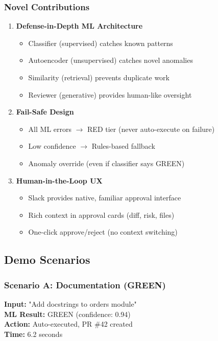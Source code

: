 \documentclass[11pt,a4paper]{article}
\begin{document}
\subsubsection{Novel Contributions}
\begin{enumerate}
    \item \textbf{Defense-in-Depth ML Architecture}
    \begin{itemize}
        \item Classifier (supervised) catches known patterns
        \item Autoencoder (unsupervised) catches novel anomalies
        \item Similarity (retrieval) prevents duplicate work
        \item Reviewer (generative) provides human-like oversight
    \end{itemize}
    
    \item \textbf{Fail-Safe Design}
    \begin{itemize}
        \item All ML errors $\rightarrow$ RED tier (never auto-execute on failure)
        \item Low confidence $\rightarrow$ Rules-based fallback
        \item Anomaly override (even if classifier says GREEN)
    \end{itemize}
    
    \item \textbf{Human-in-the-Loop UX}
    \begin{itemize}
        \item Slack provides native, familiar approval interface
        \item Rich context in approval cards (diff, risk, files)
        \item One-click approve/reject (no context switching)
    \end{itemize}
\end{enumerate}

\subsection{Demo Scenarios}

\subsubsection{Scenario A: Documentation (GREEN)}
\begin{tcolorbox}[colback=green!5,colframe=green!60!black]
\textbf{Input:} "Add docstrings to orders module" \\
\textbf{ML Result:} GREEN (confidence: 0.94) \\
\textbf{Action:} Auto-executed, PR \#42 created \\
\textbf{Time:} 6.2 seconds
\end{tcolorbox}
\end{document}
